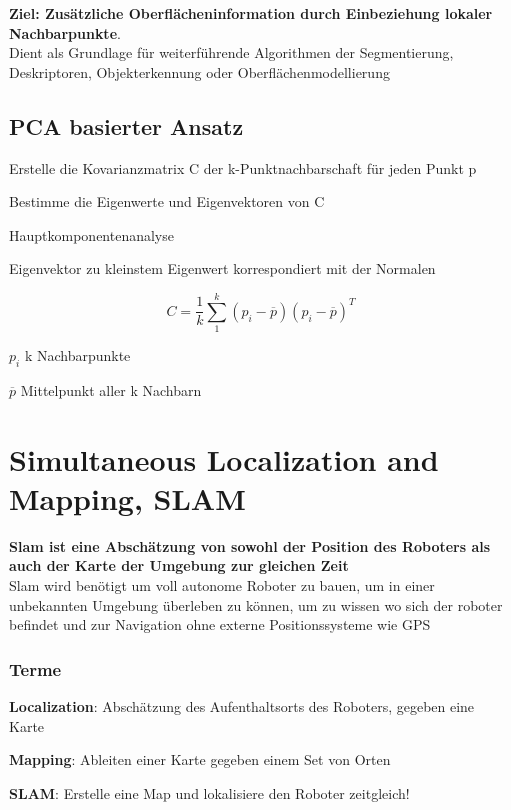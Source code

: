 \textbf{Ziel: Zusätzliche Oberflächeninformation durch Einbeziehung lokaler
Nachbarpunkte}. \\
Dient als Grundlage für weiterführende Algorithmen der Segmentierung,
Deskriptoren, Objekterkennung oder Oberflächenmodellierung

\subsection{PCA basierter Ansatz}
\begin{compactitem}
    \item Erstelle die Kovarianzmatrix C der k-Punktnachbarschaft für jeden Punkt p
    \item Bestimme die Eigenwerte und Eigenvektoren von C
    \begin{compactitem}
        \item Hauptkomponentenanalyse
        \item Eigenvektor zu kleinstem Eigenwert korrespondiert mit der Normalen
    \end{compactitem}
\end{compactitem}
\begin{displaymath}
     C = \frac{1}{k}\sum_1^k (p_i - \overline{p})(p_i - \overline{p})^T
\end{displaymath}
\begin{compactitem}
    \item $p_i$ k Nachbarpunkte
    \item $\overline{p}$ Mittelpunkt aller k Nachbarn
\end{compactitem}

\section{Simultaneous Localization and Mapping, SLAM}
\textbf{Slam ist eine Abschätzung von sowohl der Position des Roboters als auch der
Karte der Umgebung zur gleichen Zeit} \\

Slam wird benötigt um voll autonome Roboter zu bauen, um in einer unbekannten
Umgebung überleben zu können, um zu wissen wo sich der roboter befindet und zur
Navigation ohne externe Positionssysteme wie GPS

\subsubsection{Terme}
\begin{compactitem}
    \item \textbf{Localization}: Abschätzung des Aufenthaltsorts des Roboters, gegeben
    eine Karte
    \item \textbf{Mapping}: Ableiten einer Karte gegeben einem Set von Orten
    \item \textbf{SLAM}: Erstelle eine Map und lokalisiere den Roboter zeitgleich!
\end{compactitem}

